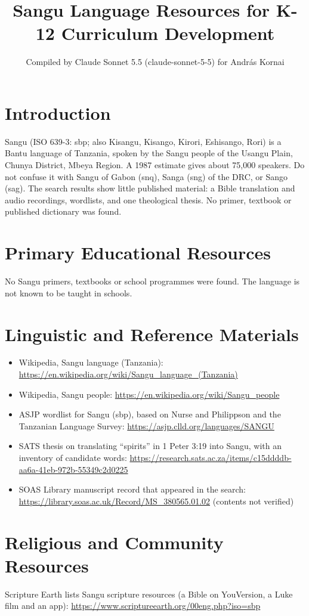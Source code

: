 \documentclass[12pt]{article}
\title{Sangu Language Resources for K-12 Curriculum Development}
\author{Compiled by Claude Sonnet 5.5 (claude-sonnet-5-5) for Andr\'as Kornai}
\date{}
\begin{document}
\maketitle

\section{Introduction}
Sangu (ISO 639-3: sbp; also Kisangu, Kisango, Kirori, Eshisango, Rori) is a Bantu language of Tanzania, spoken by the Sangu people of the Usangu Plain, Chunya District, Mbeya Region. A 1987 estimate gives about 75,000 speakers. Do not confuse it with Sangu of Gabon (snq), Sanga (sng) of the DRC, or Sango (sag). The search results show little published material: a Bible translation and audio recordings, wordlists, and one theological thesis. No primer, textbook or published dictionary was found.

\section{Primary Educational Resources}
No Sangu primers, textbooks or school programmes were found. The language is not known to be taught in schools.

\section{Linguistic and Reference Materials}
\begin{itemize}
\item Wikipedia, Sangu language (Tanzania): \url{https://en.wikipedia.org/wiki/Sangu_language_(Tanzania)}
\item Wikipedia, Sangu people: \url{https://en.wikipedia.org/wiki/Sangu_people}
\item ASJP wordlist for Sangu (sbp), based on Nurse and Philippson and the Tanzanian Language Survey: \url{https://asjp.clld.org/languages/SANGU}
\item SATS thesis on translating ``spirits'' in 1 Peter 3:19 into Sangu, with an inventory of candidate words: \url{https://research.sats.ac.za/items/c15ddddb-aa6a-41eb-972b-55349c2d0225}
\item SOAS Library manuscript record that appeared in the search: \url{https://library.soas.ac.uk/Record/MS_380565.01.02} (contents not verified)
\end{itemize}

\section{Religious and Community Resources}
Scripture Earth lists Sangu scripture resources (a Bible on YouVersion, a Luke film and an app): \url{https://www.scriptureearth.org/00eng.php?iso=sbp}
\end{document}
